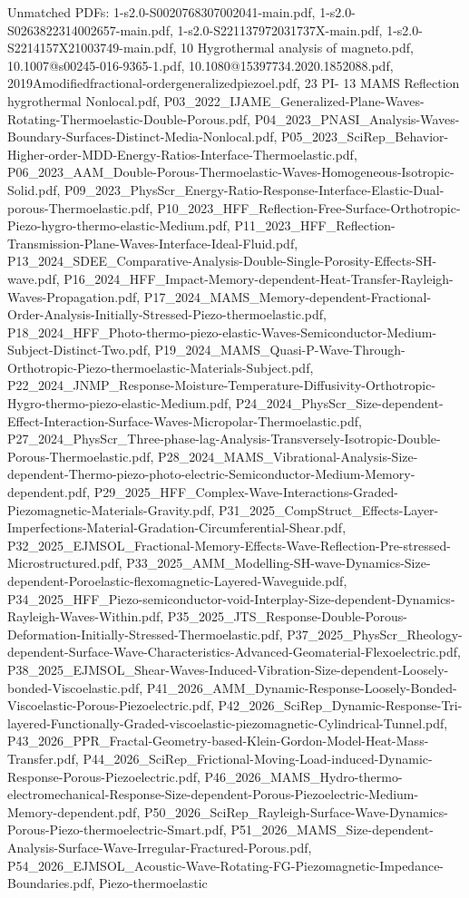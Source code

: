 \documentclass[12pt,a4paper]{article}
\begin{document}
Unmatched PDFs: 1-s2.0-S0020768307002041-main.pdf, 1-s2.0-S0263822314002657-main.pdf, 1-s2.0-S221137972031737X-main.pdf, 1-s2.0-S2214157X21003749-main.pdf, 10 Hygrothermal analysis of magneto.pdf, 10.1007@s00245-016-9365-1.pdf, 10.1080@15397734.2020.1852088.pdf, 2019Amodifiedfractional-ordergeneralizedpiezoel.pdf, 23 PI- 13 MAMS Reflection hygrothermal Nonlocal.pdf, P03_2022_IJAME_Generalized-Plane-Waves-Rotating-Thermoelastic-Double-Porous.pdf, P04_2023_PNASI_Analysis-Waves-Boundary-Surfaces-Distinct-Media-Nonlocal.pdf, P05_2023_SciRep_Behavior-Higher-order-MDD-Energy-Ratios-Interface-Thermoelastic.pdf, P06_2023_AAM_Double-Porous-Thermoelastic-Waves-Homogeneous-Isotropic-Solid.pdf, P09_2023_PhysScr_Energy-Ratio-Response-Interface-Elastic-Dual-porous-Thermoelastic.pdf, P10_2023_HFF_Reflection-Free-Surface-Orthotropic-Piezo-hygro-thermo-elastic-Medium.pdf, P11_2023_HFF_Reflection-Transmission-Plane-Waves-Interface-Ideal-Fluid.pdf, P13_2024_SDEE_Comparative-Analysis-Double-Single-Porosity-Effects-SH-wave.pdf, P16_2024_HFF_Impact-Memory-dependent-Heat-Transfer-Rayleigh-Waves-Propagation.pdf, P17_2024_MAMS_Memory-dependent-Fractional-Order-Analysis-Initially-Stressed-Piezo-thermoelastic.pdf, P18_2024_HFF_Photo-thermo-piezo-elastic-Waves-Semiconductor-Medium-Subject-Distinct-Two.pdf, P19_2024_MAMS_Quasi-P-Wave-Through-Orthotropic-Piezo-thermoelastic-Materials-Subject.pdf, P22_2024_JNMP_Response-Moisture-Temperature-Diffusivity-Orthotropic-Hygro-thermo-piezo-elastic-Medium.pdf, P24_2024_PhysScr_Size-dependent-Effect-Interaction-Surface-Waves-Micropolar-Thermoelastic.pdf, P27_2024_PhysScr_Three-phase-lag-Analysis-Transversely-Isotropic-Double-Porous-Thermoelastic.pdf, P28_2024_MAMS_Vibrational-Analysis-Size-dependent-Thermo-piezo-photo-electric-Semiconductor-Medium-Memory-dependent.pdf, P29_2025_HFF_Complex-Wave-Interactions-Graded-Piezomagnetic-Materials-Gravity.pdf, P31_2025_CompStruct_Effects-Layer-Imperfections-Material-Gradation-Circumferential-Shear.pdf, P32_2025_EJMSOL_Fractional-Memory-Effects-Wave-Reflection-Pre-stressed-Microstructured.pdf, P33_2025_AMM_Modelling-SH-wave-Dynamics-Size-dependent-Poroelastic-flexomagnetic-Layered-Waveguide.pdf, P34_2025_HFF_Piezo-semiconductor-void-Interplay-Size-dependent-Dynamics-Rayleigh-Waves-Within.pdf, P35_2025_JTS_Response-Double-Porous-Deformation-Initially-Stressed-Thermoelastic.pdf, P37_2025_PhysScr_Rheology-dependent-Surface-Wave-Characteristics-Advanced-Geomaterial-Flexoelectric.pdf, P38_2025_EJMSOL_Shear-Waves-Induced-Vibration-Size-dependent-Loosely-bonded-Viscoelastic.pdf, P41_2026_AMM_Dynamic-Response-Loosely-Bonded-Viscoelastic-Porous-Piezoelectric.pdf, P42_2026_SciRep_Dynamic-Response-Tri-layered-Functionally-Graded-viscoelastic-piezomagnetic-Cylindrical-Tunnel.pdf, P43_2026_PPR_Fractal-Geometry-based-Klein-Gordon-Model-Heat-Mass-Transfer.pdf, P44_2026_SciRep_Frictional-Moving-Load-induced-Dynamic-Response-Porous-Piezoelectric.pdf, P46_2026_MAMS_Hydro-thermo-electromechanical-Response-Size-dependent-Porous-Piezoelectric-Medium-Memory-dependent.pdf, P50_2026_SciRep_Rayleigh-Surface-Wave-Dynamics-Porous-Piezo-thermoelectric-Smart.pdf, P51_2026_MAMS_Size-dependent-Analysis-Surface-Wave-Irregular-Fractured-Porous.pdf, P54_2026_EJMSOL_Acoustic-Wave-Rotating-FG-Piezomagnetic-Impedance-Boundaries.pdf, Piezo-thermoelastic 
\end{document}
